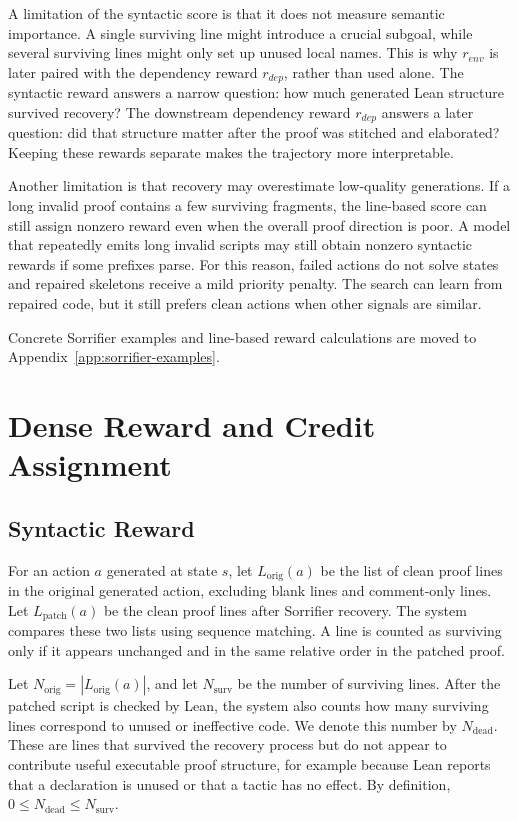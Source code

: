 \documentclass[en]{uet_awesome_thesis/uet-awesome-thesis}
\begin{document}
A limitation of the syntactic score is that it does not measure semantic importance. A single surviving
line might introduce a crucial subgoal, while several surviving lines might only set up unused
local names. This is why \(r_{env}\) is later paired with the dependency reward \(r_{dep}\), rather than used alone. The
syntactic reward answers a narrow question: how much generated Lean structure survived recovery?
The downstream dependency reward \(r_{dep}\) answers a later question: did that structure matter after the proof was stitched
and elaborated? Keeping these rewards separate makes the trajectory more interpretable.

Another limitation is that recovery may overestimate low-quality generations. If a long invalid proof contains a few surviving fragments, the line-based score can still assign nonzero reward even when the overall proof direction is poor. 
A model that repeatedly emits long invalid scripts may still obtain nonzero syntactic rewards if some prefixes
parse. For this reason, failed actions do not solve states and repaired skeletons receive a mild priority
penalty. The search can learn from repaired code, but it still prefers clean actions when other signals are
similar.


Concrete Sorrifier examples and line-based reward calculations are moved to Appendix~\ref{app:sorrifier-examples}.

\chapter{Dense Reward and Credit Assignment}
\label{sec:reward}

\section{Syntactic Reward}
\label{subsec:syntactic-reward}

For an action \(a\) generated at state \(s\), let \(L_{\text{orig}}(a)\) be the list of clean proof lines in
the original generated action, excluding blank lines and comment-only lines. Let \(L_{\text{patch}}(a)\)
be the clean proof lines after Sorrifier recovery. The system compares these two lists using sequence
matching. A line is counted as surviving only if it appears unchanged and in the same relative order in
the patched proof.

Let \(N_{\text{orig}} = |L_{\text{orig}}(a)|\), and let \(N_{\text{surv}}\) be the number of surviving lines.
After the patched script is checked by Lean, the system also counts how many surviving lines correspond
to unused or ineffective code. We denote this number by \(N_{\text{dead}}\). These are lines that survived
the recovery process but do not appear to contribute useful executable proof structure, for example
because Lean reports that a declaration is unused or that a tactic has no effect. By definition,
\(0 \leq N_{\text{dead}} \leq N_{\text{surv}}\).
\end{document}
